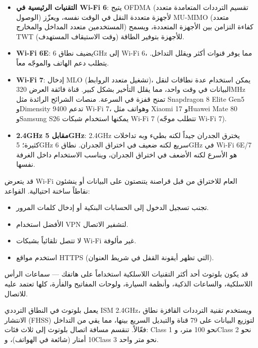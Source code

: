 \begin{itemize}
  \item \textbf{التقنيات الرئيسية في Wi-Fi 6}: يتيح OFDMA (تقسيم الترددات المتعامدة متعدد الوصول) لأجهزة متعددة النقل في الوقت نفسه، ويعزّز MU-MIMO (متعدد المستخدمين متعدد المداخل والمخارج) كفاءة التزامن بين الأجهزة المتعددة، ويسمح TWT (وقت الاستيقاف المستهدف) للأجهزة بتوفير الطاقة.
  \item \textbf{Wi-Fi 6E}: يضيف نطاق 6GHz إلى Wi-Fi 6، مما يوفر قنوات أكثر ويقلل التداخل. يتطلب دعم الهاتف والموجّه معاً.
  \item \textbf{Wi-Fi 7}: إدخال MLO (تشغيل متعدد الروابط)، يمكن استخدام عدة نطاقات لنقل البيانات في وقت واحد، مما يقلل التأخير بشكل كبير. قناة فائقة العرض 320MHz تمنح قفزة في السرعة. منصات الشرائح الرائدة مثل Snapdragon 8 Elite Gen5 وDimensity 9400 تدعم Wi-Fi 7، وهواتف مثل Xiaomi 17 وHuawei Mate 80 وSamsung S26 يمكنها استخدام شبكات Wi-Fi 7 (تتطلب موجّه Wi-Fi 7).
  \item \textbf{2.4GHz مقابل 5GHz}: 2.4GHz يخترق الجدران جيداً لكنه بطيء وبه تداخلات كثيرة؛ 5GHz سريع لكنه ضعيف في اختراق الجدران. نطاق 6GHz في Wi-Fi 6E/7 هو الأسرع لكنه الأضعف في اختراق الجدران، ويناسب الاستخدام داخل الغرفة نفسها.
\end{itemize}


قد يتعرض Wi-Fi العام للاختراق من قبل قراصنة يتنصتون على البيانات أو ينشئون نقاطاً ساخنة احتيالية. القواعد:

\begin{itemize}
  \item تجنب تسجيل الدخول إلى الحسابات البنكية أو إدخال كلمات المرور.
  \item الأفضل استخدام VPN لتشفير الاتصال.
  \item لا تتصل تلقائياً بشبكات Wi-Fi غير مألوفة.
  \item استخدم مواقع HTTPS (التي تظهر أيقونة القفل في شريط العنوان).
\end{itemize}


قد يكون بلوتوث أحد أكثر التقنيات اللاسلكية استخداماً على هاتفك — سماعات الرأس اللاسلكية، والساعات الذكية، وأنظمة السيارة، ولوحات المفاتيح والفأرة، كلها تعتمد عليه للاتصال.


يعمل بلوتوث في النطاق الترددي ISM 2.4GHz، ويستخدم تقنية الترددات القافزة نطاق الانتشار (FHSS) لتوزيع البيانات على 79 قناة والتبديل السريع بينها، مما يقي من التداخل فعّالاً. تنقسم مسافة اتصال بلوتوث إلى ثلاث فئات: Class 1 نحو 100 متر، وClass 2 نحو 10 أمتار (شائعة في الهواتف)، وClass 3 نحو متر واحد.

